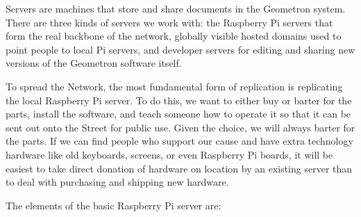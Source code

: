 
Servers are machines that store and share documents in the Geometron system.  There are three kinds of servers we work with: the Raspberry Pi servers that form the real backbone of the network, globally visible hosted domains used to point people to local Pi servers, and developer servers for editing and sharing new versions of the Geometron software itself.  

To spread the Network, the most fundamental form of replication is replicating the local Raspberry Pi server.  To do this, we want to either buy or barter for the parts, install the software, and teach someone how to operate it so that it can be sent out onto the Street for public use.  Given the choice, we will always barter for the parts.  If we can find people who support our cause and have extra technology hardware like old keyboards, screens, or even Raspberry Pi boards, it will be easiest to take direct donation of hardware on location by an existing server than to deal with purchasing and shipping new hardware.

The elements of the basic Raspberry Pi server are:

